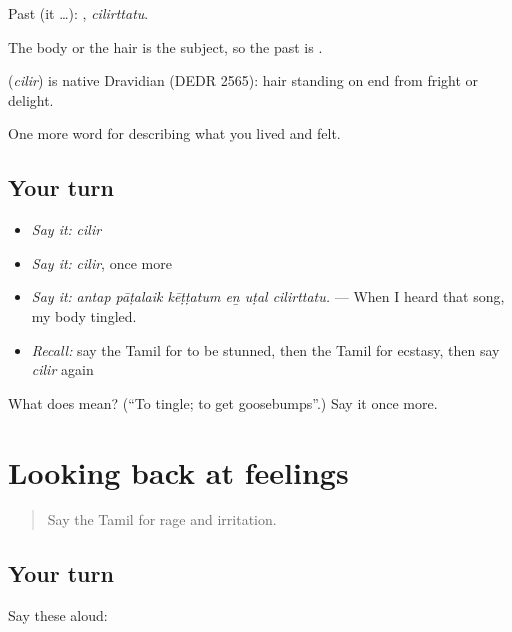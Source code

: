 Past (it …): , \emph{cilirttatu}.

The body or the hair is the subject, so the past is .

\begin{cousinweb}
\textbf{} (\emph{cilir}) is native Dravidian (DEDR 2565): hair standing on end from fright or delight.
\end{cousinweb}

\begin{grammarlens}[title={What you've built}]
One more word for describing what you lived and felt.
\end{grammarlens}

\subsection*{Your turn}
\begin{itemize}
\raggedright
  \item \emph{Say it:} \emph{cilir}
  \item \emph{Say it:} \emph{cilir}, once more
  \item \emph{Say it:} \emph{antap pāṭalaik kēṭṭatum eṉ uṭal cilirttatu.} — When I heard that song, my body tingled.
  \item \emph{Recall:} say the Tamil for to be stunned, then the Tamil for ecstasy, then say \emph{cilir} again
\end{itemize}

\begin{tcolorbox}[breakable,colback=teal!4,colframe=teal!35!black,title={Before you move on}]
What does  mean? (\textquotedblleft{}To tingle; to get goosebumps\textquotedblright{}.) Say it once more.
\end{tcolorbox}
\section[(dialogue)]{Looking back at feelings}

\label{lesson:TA-R460-review-453-460}



\begin{quote}
Say the Tamil for rage and irritation.
\end{quote}

\subsection*{Your turn}
Say these aloud:


